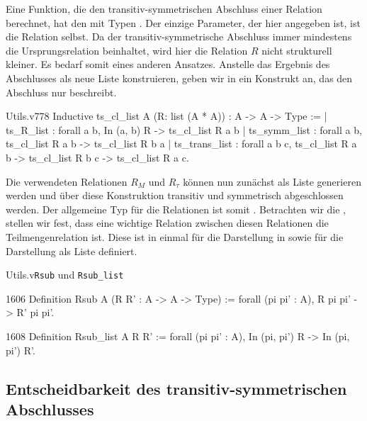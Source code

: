 Eine Funktion, die den transitiv-symmetrischen Abschluss einer Relation berechnet, hat den mit Typen . Der einzige Parameter, der hier angegeben ist, ist die Relation selbst. Da der transitiv-symmetrische Abschluss immer mindestens die Ursprungsrelation beinhaltet, wird hier die Relation $R$ nicht strukturell kleiner. Es bedarf somit eines anderen Ansatzes. Anstelle das Ergebnis des Abschlusses als neue Liste konstruieren, geben wir in  ein Konstrukt an, das den Abschluss nur beschreibt.

\begin{code}[ts_cl_list]{Utils.v}{}{778}
Inductive ts_cl_list {A} (R: list (A * A)) : A -> A -> Type :=
  | ts_R_list : forall a b, In (a, b) R -> ts_cl_list R a b
  | ts_symm_list : forall a b, ts_cl_list R a b -> ts_cl_list R b a
  | ts_trans_list : forall a b c, 
      ts_cl_list R a b -> ts_cl_list R b c -> ts_cl_list R a c.
\end{code}

Die verwendeten Relationen $R_M$ und $R_\tau$ können nun zunächst als Liste generieren werden und über diese Konstruktion transitiv und symmetrisch abgeschlossen werden. Der allgemeine Typ für die Relationen ist somit . Betrachten wir die , stellen wir fest, dass eine wichtige Relation zwischen diesen Relationen die Teilmengenrelation ist. Diese ist in  einmal für die Darstellung in  sowie für die Darstellung als Liste definiert.
\begin{multicode}[Rsub]{Utils.v}{}{\texttt{Rsub} und \texttt{Rsub\_list}}
    \begin{mcode}{1606}
Definition Rsub {A} (R R' : A -> A -> Type) := forall (pi pi' : A), 
    R pi pi' -> R' pi pi'.
    \end{mcode}
    \begin{mcode}{1608}        
Definition Rsub_list {A} R R' := forall (pi pi' : A), 
    In (pi, pi') R -> In (pi, pi') R'.
    \end{mcode}
\end{multicode}

\subsection{Entscheidbarkeit des transitiv-symmetrischen Abschlusses}
\label{sec:ts_dec}

